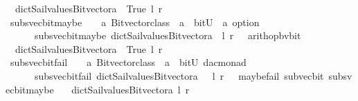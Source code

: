 \begin{isabellebody}
\ \ dict{\isacharunderscore}Sail{}{\isacharunderscore}values{\isacharunderscore}Bitvector{\isacharunderscore}a\ {\isacharparenleft}{\isacharminus}{\isacharparenright}\ True\ l\ r\ {\isacharparenright}{\isachardoublequoteclose}\isanewline
\isanewline
{}\isamarkupfalse%
\ subs{\isacharunderscore}vec{\isacharunderscore}bit{\isacharunderscore}maybe\ \ {\isacharcolon}{\isacharcolon}\ {\isachardoublequoteopen}\ {\isacharprime}a\ Bitvector{\isacharunderscore}class\ {\isasymRightarrow}\ {\isacharprime}a\ {\isasymRightarrow}\ bitU\ {\isasymRightarrow}\ {\isacharprime}a\ option\ {\isachardoublequoteclose}\ \ \ \isanewline
\ \ \ \ \ {\isachardoublequoteopen}\ subs{\isacharunderscore}vec{\isacharunderscore}bit{\isacharunderscore}maybe\ dict{\isacharunderscore}Sail{}{\isacharunderscore}values{\isacharunderscore}Bitvector{\isacharunderscore}a\ \ l\ r\ {\isacharequal}\ {\isacharparenleft}\ arith{\isacharunderscore}op{\isacharunderscore}bv{\isacharunderscore}bit\ \isanewline
\ \ dict{\isacharunderscore}Sail{}{\isacharunderscore}values{\isacharunderscore}Bitvector{\isacharunderscore}a\ {\isacharparenleft}{\isacharminus}{\isacharparenright}\ True\ l\ r\ {\isacharparenright}{\isachardoublequoteclose}\isanewline
\isanewline
{}\isamarkupfalse%
\ subs{\isacharunderscore}vec{\isacharunderscore}bit{\isacharunderscore}fail\ \ {\isacharcolon}{\isacharcolon}\ {\isachardoublequoteopen}\ {\isacharprime}a\ Bitvector{\isacharunderscore}class\ {\isasymRightarrow}\ {\isacharprime}a\ {\isasymRightarrow}\ bitU\ {\isasymRightarrow}{\isacharparenleft}{\isacharprime}d{\isacharcomma}{\isacharprime}a{\isacharcomma}{\isacharprime}c{\isacharparenright}monad\ {\isachardoublequoteclose}\ \ \ \isanewline
\ \ \ \ \ {\isachardoublequoteopen}\ subs{\isacharunderscore}vec{\isacharunderscore}bit{\isacharunderscore}fail\ dict{\isacharunderscore}Sail{}{\isacharunderscore}values{\isacharunderscore}Bitvector{\isacharunderscore}a\ \ \ l\ r\ {\isacharequal}\ {\isacharparenleft}\ maybe{\isacharunderscore}fail\ {\isacharparenleft}{\isacharprime}{\isacharprime}sub{\isacharunderscore}vec{\isacharunderscore}bit{\isacharprime}{\isacharprime}{\isacharparenright}\ {\isacharparenleft}subs{\isacharunderscore}vec{\isacharunderscore}bit{\isacharunderscore}maybe\ \isanewline
\ \ dict{\isacharunderscore}Sail{}{\isacharunderscore}values{\isacharunderscore}Bitvector{\isacharunderscore}a\ l\ r{\isacharparenright}{\isacharparenright}{\isachardoublequoteclose}\isanewline
\isanewline
{}\isamarkupfalse%

\end{isabellebody}

